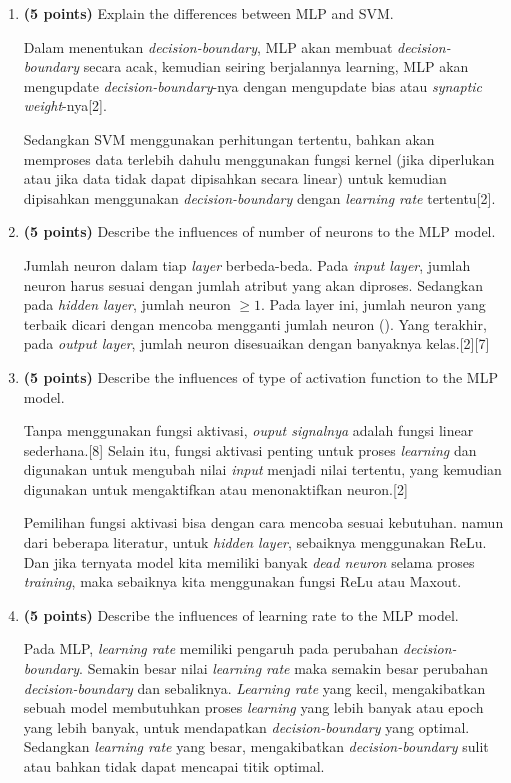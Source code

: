 \documentclass[12pt]{article}%
\begin{document}
\begin{enumerate}
	\item \textbf{(5 points)} Explain the differences between MLP and SVM.
	\par Dalam menentukan \textit{decision-boundary}, MLP akan membuat \textit{decision-boundary} secara acak, kemudian seiring berjalannya learning, MLP akan mengupdate \textit{decision-boundary}-nya dengan mengupdate bias atau \textit{synaptic weight}-nya[2].

	\par Sedangkan SVM menggunakan perhitungan tertentu, bahkan akan memproses data terlebih dahulu menggunakan fungsi kernel (jika diperlukan atau jika data tidak dapat dipisahkan secara linear) untuk kemudian dipisahkan menggunakan \textit{decision-boundary} dengan \textit{learning rate} tertentu[2].

	\item \textbf{(5 points)} Describe the influences of number of neurons to the MLP model.
	\par Jumlah neuron dalam tiap \textit{layer} berbeda-beda. Pada \textit{input layer}, jumlah neuron harus sesuai dengan jumlah atribut yang akan diproses. Sedangkan pada \textit{hidden layer}, jumlah neuron $\geq 1$. Pada layer ini, jumlah neuron yang terbaik dicari dengan mencoba mengganti jumlah neuron (). Yang terakhir, pada \textit{output layer}, jumlah neuron disesuaikan dengan banyaknya kelas.[2][7]

	\item \textbf{(5 points)} Describe the influences of type of activation function to the MLP model.
	\par Tanpa menggunakan fungsi aktivasi, \textit{ouput signalnya} adalah fungsi linear sederhana.[8] Selain itu, fungsi aktivasi penting untuk proses \textit{learning} dan digunakan untuk mengubah nilai \textit{input} menjadi nilai tertentu, yang kemudian digunakan untuk mengaktifkan atau menonaktifkan neuron.[2]

	\par Pemilihan fungsi aktivasi bisa dengan cara mencoba sesuai kebutuhan. namun dari beberapa literatur, untuk \textit{hidden layer}, sebaiknya menggunakan ReLu. Dan jika ternyata model kita memiliki banyak \textit{dead neuron} selama proses \textit{training}, maka sebaiknya kita menggunakan fungsi ReLu atau Maxout.


	\item \textbf{(5 points)} Describe the influences of learning rate to the MLP model.
	\par Pada MLP, \textit{learning rate} memiliki pengaruh pada perubahan \textit{decision-boundary}. Semakin besar nilai \textit{learning rate} maka semakin besar perubahan \textit{decision-boundary} dan sebaliknya. \textit{Learning rate} yang kecil, mengakibatkan sebuah model membutuhkan proses \textit{learning} yang lebih banyak atau epoch yang lebih banyak, untuk mendapatkan \textit{decision-boundary} yang optimal. Sedangkan \textit{learning rate} yang besar, mengakibatkan \textit{decision-boundary} sulit atau bahkan tidak dapat mencapai titik optimal.


\end{enumerate}
\end{document}
